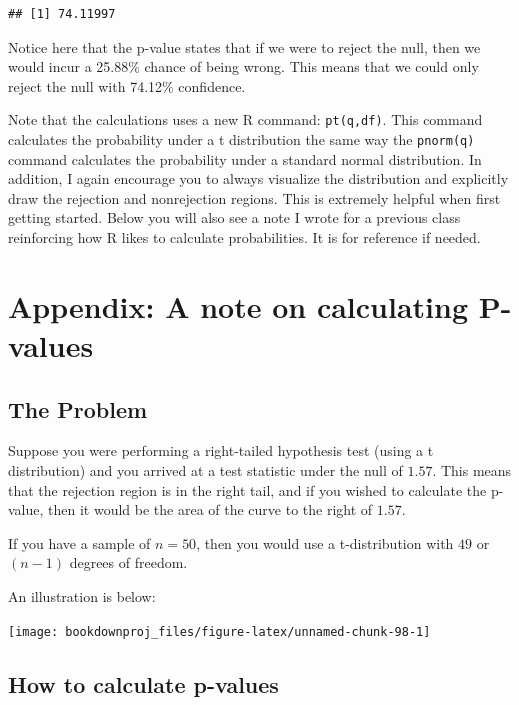 \documentclass[
]{book}
\begin{document}
\begin{verbatim}
## [1] 74.11997
\end{verbatim}

Notice here that the p-value states that if we were to reject the null, then we would incur a 25.88\% chance of being wrong. This means that we could only reject the null with 74.12\% confidence.

Note that the calculations uses a new R command: \texttt{pt(q,df)}. This command calculates the probability under a t distribution the same way the \texttt{pnorm(q)} command calculates the probability under a standard normal distribution. In addition, I again encourage you to always visualize the distribution and explicitly draw the rejection and nonrejection regions. This is extremely helpful when first getting started. Below you will also see a note I wrote for a previous class reinforcing how R likes to calculate probabilities. It is for reference if needed.

\hypertarget{appendix-a-note-on-calculating-p-values}{%
\section{Appendix: A note on calculating P-values}\label{appendix-a-note-on-calculating-p-values}}

\hypertarget{the-problem}{%
\subsection{The Problem}\label{the-problem}}

Suppose you were performing a right-tailed hypothesis test (using a t distribution) and you arrived at a test statistic under the null of \(1.57\). This means that the rejection region is in the right tail, and if you wished to calculate the p-value, then it would be the area of the curve to the right of \(1.57\).

If you have a sample of \(n = 50\), then you would use a t-distribution with \(49\) or \((n-1)\) degrees of freedom.

An illustration is below:

\begin{center}\texttt{[image: bookdownproj\_files/figure-latex/unnamed-chunk-98-1]} \end{center}

\hypertarget{how-to-calculate-p-values}{%
\subsection{How to calculate p-values}\label{how-to-calculate-p-values}}
\end{document}
